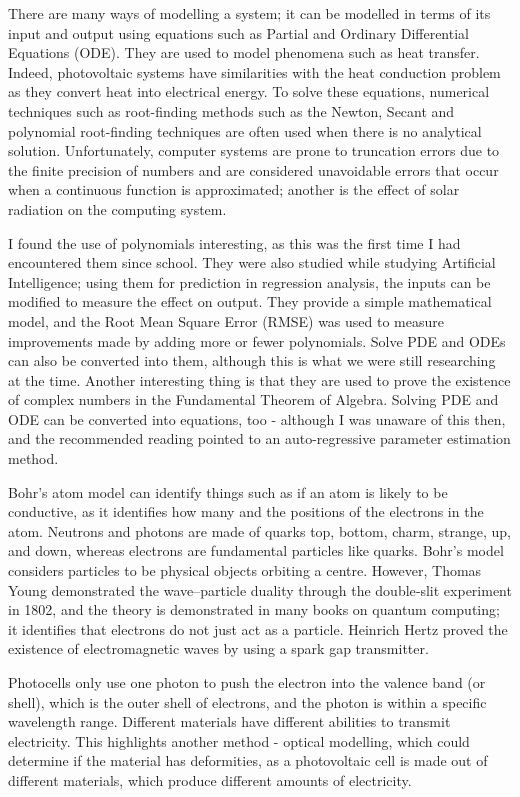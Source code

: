 \documentclass{article}
\begin{document}
There are many ways of modelling a system; it can be modelled in terms of its input and output using equations such as Partial and Ordinary Differential Equations (ODE). They are used to model phenomena such as heat transfer. Indeed, photovoltaic systems have similarities with the heat conduction problem as they convert heat into electrical energy. To solve these equations, numerical techniques such as root-finding methods such as the Newton, Secant and polynomial root-finding techniques are often used when there is no analytical solution. Unfortunately, computer systems are prone to truncation errors due to the finite precision of numbers and are considered unavoidable errors that occur when a continuous function is approximated; another is the effect of solar radiation on the computing system. 

I found the use of polynomials interesting, as this was the first time I had encountered them since school. They were also studied while studying Artificial Intelligence; using them for prediction in regression analysis, the inputs can be modified to measure the effect on output. They provide a simple mathematical model, and the Root Mean Square Error (RMSE) was used to measure improvements made by adding more or fewer polynomials. Solve PDE and ODEs can also be converted into them, although this is what we were still researching at the time. Another interesting thing is that they are used to prove the existence of complex numbers in the Fundamental Theorem of Algebra. Solving PDE and ODE can be converted into equations, too - although I was unaware of this then, and the recommended reading pointed to an auto-regressive parameter estimation method.

Bohr's atom model can identify things such as if an atom is likely to be conductive, as it identifies how many and the positions of the electrons in the atom. Neutrons and photons are made of quarks top, bottom, charm, strange, up, and down, whereas electrons are fundamental particles like quarks. Bohr's model considers particles to be physical objects orbiting a centre. However, Thomas Young demonstrated the wave–particle duality through the double‐slit experiment in 1802, and the theory is demonstrated in many books on quantum computing; it identifies that electrons do not just act as a particle. Heinrich Hertz proved the existence of electromagnetic waves by using a spark gap transmitter. 

Photocells only use one photon to push the electron into the valence band (or shell), which is the outer shell of electrons, and the photon is within a specific wavelength range. Different materials have different abilities to transmit electricity. This highlights another method - optical modelling, which could determine if the material has deformities, as a photovoltaic cell is made out of different materials, which produce different amounts of electricity. 
\end{document}
